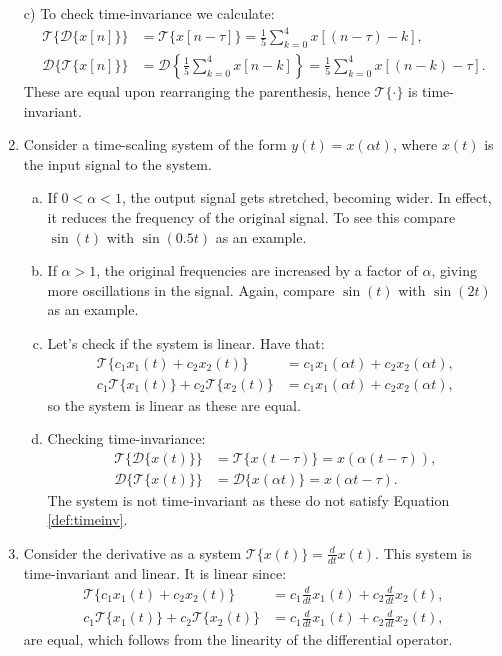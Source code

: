 \begin{enumerate}
\item[c)] To check time-invariance we calculate:
\begin{align*}
    \mathcal{T}\{\mathcal{D}\{x[n]\}\}&=\mathcal{T}\{x[n-\tau]\}=\frac{1}{5}\sum_{k=0}^{4}x[(n-\tau)-k], \\
    \mathcal{D}\{\mathcal{T}\{x[n]\}\}&=\mathcal{D}\left\{\frac{1}{5}\sum_{k=0}^{4}x[n-k]\right\}=\frac{1}{5}\sum_{k=0}^{4}x[(n-k)-\tau].
\end{align*}
These are equal upon rearranging the parenthesis, hence $\mathcal{T}\{\cdot\}$ is time-invariant. 

\item Consider a time-scaling system of the form $y(t)=x(\alpha t)$, where $x(t)$ is the input signal to the system. 

\begin{enumerate}[a)]
\item If $0<\alpha<1$, the output signal gets stretched, becoming wider. In effect, it reduces the frequency of the original signal. 
To see this compare $\sin(t)$ with $\sin(0.5t)$ as an example. 

\item If $\alpha>1$, the original frequencies are increased by a factor of $\alpha$, giving more oscillations in the signal. 
Again, compare $\sin(t)$ with $\sin(2t)$ as an example.

\item Let's check if the system is linear. Have that:
\begin{align*}
    \mathcal{T}\{c_{1}x_{1}(t)+c_{2}x_{2}(t)\}&= c_{1}x_{1}(\alpha t) + c_{2}x_{2}(\alpha t), \\
    c_{1}\mathcal{T}\{x_{1}(t)\}+c_{2}\mathcal{T}\{x_{2}(t)\}&=c_{1}x_{1}(\alpha t)+c_{2}x_{2}(\alpha t),
\end{align*}
so the system is linear as these are equal.

\item Checking time-invariance:
\begin{align*}
    \mathcal{T}\{\mathcal{D}\{x(t)\}\}&=\mathcal{T}\{x(t-\tau)\}=x(\alpha(t-\tau)), \\
    \mathcal{D}\{\mathcal{T}\{x(t)\}\}&=\mathcal{D}\{x(\alpha t)\}=x(\alpha t-\tau).
\end{align*}
The system is not time-invariant as these do not satisfy Equation \ref{def:timeinv}.
\end{enumerate}

\item Consider the derivative as a system $\mathcal{T}\{x(t)\}=\frac{d}{dt}x(t)$. 
This system is time-invariant and linear. It is linear since:
\begin{align*}
    \mathcal{T}\{c_{1}x_{1}(t)+c_{2}x_{2}(t)\}&=c_{1}\frac{d}{dt}x_{1}(t) + c_{2}\frac{d}{dt}x_{2}(t), \\
    c_{1}\mathcal{T}\{x_{1}(t)\}+c_{2}\mathcal{T}\{x_{2}(t)\}&=c_{1}\frac{d}{dt}x_{1}(t) + c_{2}\frac{d}{dt}x_{2}(t),
\end{align*}
are equal, which follows from the linearity of the differential operator.


\end{enumerate}
